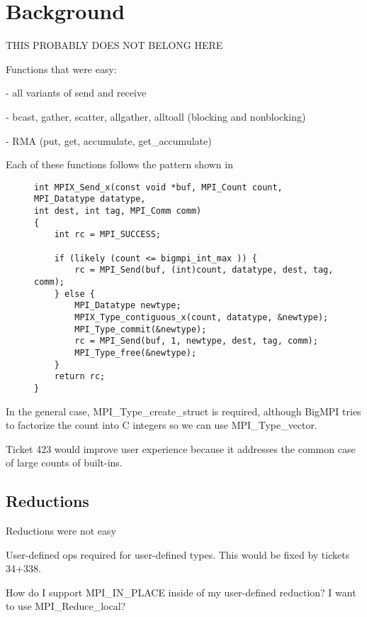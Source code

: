 
\section{Background}

THIS PROBABLY DOES NOT BELONG HERE

Functions that were easy:

- all variants of send and receive

- bcast, gather, scatter, allgather, alltoall (blocking and nonblocking)

- RMA (put, get, accumulate, get\_accumulate)

Each of these functions follows the pattern shown in 

\begin{figure}
\begin{verbatim}
int MPIX_Send_x(const void *buf, MPI_Count count, MPI_Datatype datatype,
int dest, int tag, MPI_Comm comm)
{
    int rc = MPI_SUCCESS;

    if (likely (count <= bigmpi_int_max )) {
        rc = MPI_Send(buf, (int)count, datatype, dest, tag, comm);
    } else {
        MPI_Datatype newtype;
        MPIX_Type_contiguous_x(count, datatype, &newtype);
        MPI_Type_commit(&newtype);
        rc = MPI_Send(buf, 1, newtype, dest, tag, comm);
        MPI_Type_free(&newtype);
    }
    return rc;
}
\end{verbatim}
\label{code:mpi_send_x}
\end{figure}


In the general case, MPI\_Type\_create\_struct is required, although BigMPI tries to factorize the count into C integers so we can use MPI\_Type\_vector.

Ticket 423 would improve user experience because it addresses the common case of large counts of built-ins.

\subsection{Reductions}

Reductions were not easy

User-defined ops required for user-defined types.  This would be fixed by tickets 34+338.

How do I support MPI\_IN\_PLACE inside of my user-defined reduction?
I want to use MPI\_Reduce\_local?

